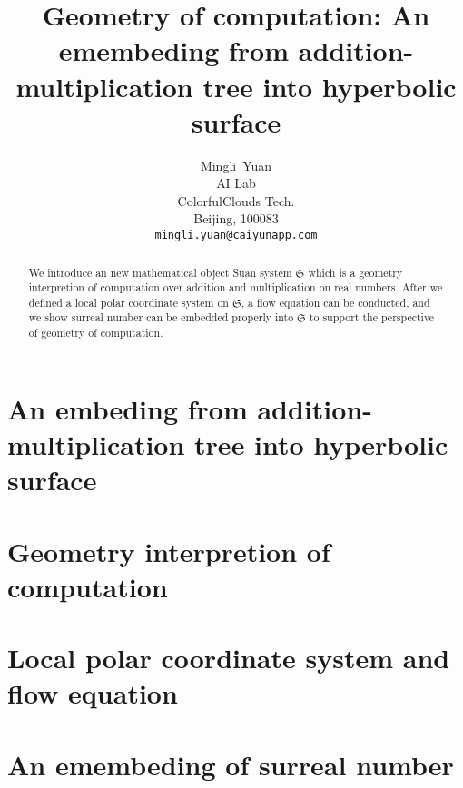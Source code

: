 \documentclass{article}
\title{Geometry of computation: An emembeding from addition-multiplication tree into hyperbolic surface}
\author{
  Mingli~Yuan \\
  AI Lab \\
  ColorfulClouds Tech.\\
  Beijing, 100083 \\
  \texttt{mingli.yuan@caiyunapp.com} \\
}
\begin{document}
\maketitle

\begin{abstract}
    We introduce an new mathematical object Suan system $\mathfrak{S}$ which is a geometry interpretion of computation
    over addition and multiplication on real numbers. After we defined a local polar coordinate system on
    $\mathfrak{S}$, a flow equation can be conducted, and we show surreal number can be embedded properly into
    $\mathfrak{S}$ to support the perspective of geometry of computation.
\end{abstract}


\section{An embeding from addition-multiplication tree into hyperbolic surface}\label{sec:aefamtihs}

\section{Geometry interpretion of computation}\label{sec:gioc}

\section{Local polar coordinate system and flow equation}\label{sec:lpcsafe}

\section{An emembeding of surreal number}\label{sec:aeosn}




\end{document}

